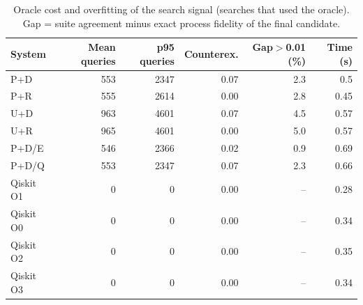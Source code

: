 \begin{table}[t]
\centering
\caption{Oracle cost and overfitting of the search signal (searches that used the oracle). Gap = suite agreement minus exact process fidelity of the final candidate.}
\label{tab:cost}
\footnotesize
\setlength{\tabcolsep}{3pt}
\begin{tabular}{lrrrrr}
\toprule
System & Mean queries & p95 queries & Counterex. & Gap$>$0.01 (\%) & Time (s) \\
\midrule
P+D & 553 & 2347 & 0.07 & 2.3 & 0.5 \\
P+R & 555 & 2614 & 0.00 & 2.8 & 0.45 \\
U+D & 963 & 4601 & 0.07 & 4.5 & 0.57 \\
U+R & 965 & 4601 & 0.00 & 5.0 & 0.57 \\
P+D/E & 546 & 2366 & 0.02 & 0.9 & 0.69 \\
P+D/Q & 553 & 2347 & 0.07 & 2.3 & 0.66 \\
Qiskit O1 & 0 & 0 & 0.00 & -- & 0.28 \\
Qiskit O0 & 0 & 0 & 0.00 & -- & 0.34 \\
Qiskit O2 & 0 & 0 & 0.00 & -- & 0.35 \\
Qiskit O3 & 0 & 0 & 0.00 & -- & 0.34 \\
\bottomrule
\end{tabular}
\end{table}
